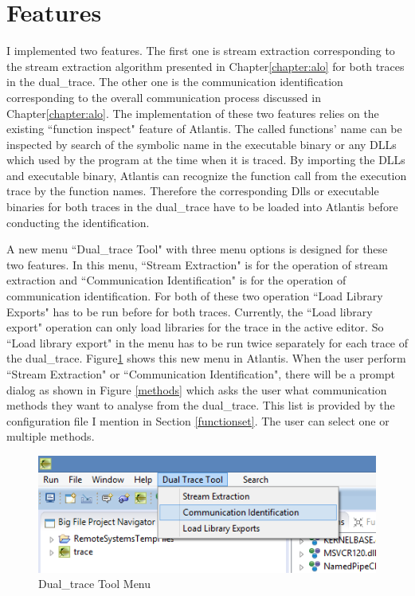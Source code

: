 \section{Features}
I implemented two features. The first one is stream extraction corresponding to the stream extraction algorithm presented in Chapter\ref{chapter:alo} for both traces in the dual\_trace. The other one is the communication identification corresponding to the overall communication process discussed in Chapter\ref{chapter:alo}. The implementation of these two features relies on the existing ``function inspect" feature of Atlantis. The called functions' name can be inspected  by  search of the symbolic name in the executable binary or any DLLs which used by the program at the time when it is traced. By importing the DLLs and executable binary, Atlantis can recognize the function call from the execution trace by the function names. Therefore the corresponding Dlls or executable binaries for both traces in the dual\_trace have to be loaded into Atlantis before conducting the identification.

A new menu ``Dual\_trace Tool" with three menu options is designed for these two features. In this menu, ``Stream Extraction" is for the operation of stream extraction and ``Communication Identification" is for the operation of communication identification. For both of these two operation ``Load Library Exports" has to be run before for both traces. Currently, the ``Load library export"  operation can only load libraries for the trace in the active editor. So ``Load library export"  in the menu has to be run twice separately for each trace of the dual\_trace.  Figure\ref{dualtracetoolmenu} shows this new menu in Atlantis. When the user perform ``Stream Extraction" or ``Communication Identification", there will be a prompt dialog as shown in Figure \ref{methods} which asks the user what communication methods they want to analyse from the dual\_trace. This list is provided by the configuration file I mention in Section \ref{functionset}. The user can select one or multiple methods. 

\begin{figure}[H]
\centerline{\includegraphics{Figures/dualtracetoolmenu}}
 \caption{Dual\_trace Tool Menu}
\label{dualtracetoolmenu}
\end{figure}

